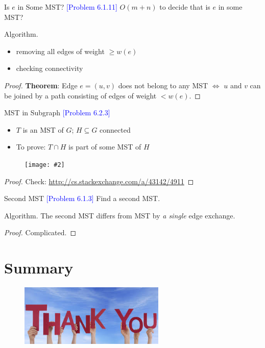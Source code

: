 \documentclass{beamer}
\newcommand{\problemno}[1]{\textcolor{blue}{\scriptsize [Problem #1]}}
\newcommand{\fignocaption}[2]
{
  \begin{figure}[htp]
    \centering
      \texttt{[image: \#2]}
  \end{figure}
}
\begin{document}
\begin{frame}{}
  \begin{block}{Is $e$ in Some MST? \problemno{6.1.11}}
    $O(m+n)$ to decide that is $e$ in some MST?
  \end{block}

  \begin{block}{Algorithm.}
    \begin{itemize}
      \item removing all edges of weight $\geq w(e)$
      \item checking connectivity
    \end{itemize}
  \end{block}

  \begin{proof}
    \textbf{Theorem}: Edge $e = (u,v)$ does not belong to any MST $\iff$ $u$ and
    $v$ can be joined by a path consisting of edges of weight $<w(e)$.
  \end{proof}
\end{frame}
\begin{frame}{}
  \begin{block}{MST in Subgraph \problemno{6.2.3}}
    \begin{itemize}
      \item $T$ is an MST of $G$; $H \subseteq G$ connected
      \item To prove: $T \cap H$ is part of some MST of $H$
    \end{itemize}
  \end{block}

  \fignocaption{width = 0.50\textwidth}{fig/mst_subgraph.pdf}

  \begin{proof}
	Check: \url{http://cs.stackexchange.com/a/43142/4911}
  \end{proof}
\end{frame}
\begin{frame}{}
  \begin{block}{Second MST \problemno{6.1.3}}
    Find a second MST.
  \end{block}

  \begin{block}{Algorithm.}
    The second MST differs from MST by \emph{a single} edge exchange.
  \end{block}

  \begin{proof}
    Complicated.
  \end{proof}
\end{frame}
\section*{Summary}
\begin{frame}{}
  \begin{figure}[htp]
    \begin{center}
      \includegraphics[width=0.618\textwidth]{fig/thankyou.jpg}
    \end{center}
  \end{figure}
\end{frame}
\end{document}
